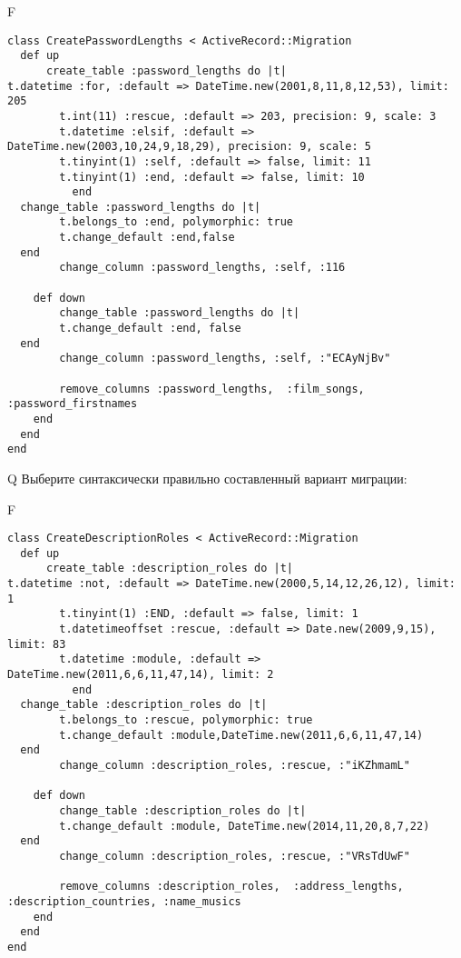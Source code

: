 F
\begin{verbatim}
class CreatePasswordLengths < ActiveRecord::Migration
  def up
	  create_table :password_lengths do |t|
t.datetime :for, :default => DateTime.new(2001,8,11,8,12,53), limit: 205
		t.int(11) :rescue, :default => 203, precision: 9, scale: 3
		t.datetime :elsif, :default => DateTime.new(2003,10,24,9,18,29), precision: 9, scale: 5
		t.tinyint(1) :self, :default => false, limit: 11
		t.tinyint(1) :end, :default => false, limit: 10
		  end
  change_table :password_lengths do |t|
		t.belongs_to :end, polymorphic: true
 		t.change_default :end,false
  end
 		change_column :password_lengths, :self, :116
   
	def down
		change_table :password_lengths do |t|
		t.change_default :end, false
  end
 		change_column :password_lengths, :self, :"ECAyNjBv"
   
		remove_columns :password_lengths,  :film_songs, :password_firstnames 
    end 
  end
end

\end{verbatim}

Q
Выберите синтаксически правильно составленный вариант миграции:

F
\begin{verbatim}
class CreateDescriptionRoles < ActiveRecord::Migration
  def up
	  create_table :description_roles do |t|
t.datetime :not, :default => DateTime.new(2000,5,14,12,26,12), limit: 1
		t.tinyint(1) :END, :default => false, limit: 1
		t.datetimeoffset :rescue, :default => Date.new(2009,9,15), limit: 83
		t.datetime :module, :default => DateTime.new(2011,6,6,11,47,14), limit: 2
		  end
  change_table :description_roles do |t|
		t.belongs_to :rescue, polymorphic: true
 		t.change_default :module,DateTime.new(2011,6,6,11,47,14)
  end
 		change_column :description_roles, :rescue, :"iKZhmamL"
   
	def down
		change_table :description_roles do |t|
		t.change_default :module, DateTime.new(2014,11,20,8,7,22)
  end
 		change_column :description_roles, :rescue, :"VRsTdUwF"
   
		remove_columns :description_roles,  :address_lengths, :description_countries, :name_musics 
    end 
  end
end

\end{verbatim}

